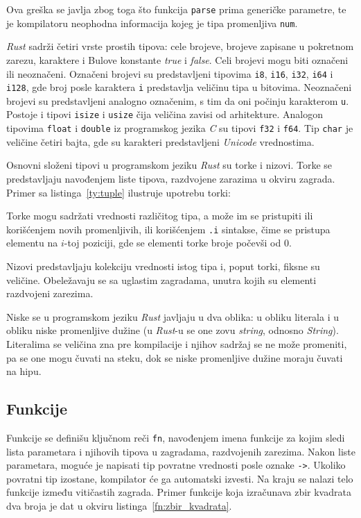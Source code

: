 \documentclass[12pt,oneside]{memoir}
\begin{document}
\noindent
Ova greška se javlja zbog toga što funkcija \texttt{parse}
prima generičke parametre, te je kompilatoru neophodna informacija
kojeg je tipa promenljiva \texttt{num}.

\emph{Rust} sadrži četiri vrste prostih tipova: cele brojeve,
brojeve zapisane u pokretnom zarezu, karaktere i Bulove
konstante \emph{true} i \emph{false}. Celi brojevi mogu biti
označeni ili neoznačeni. Označeni brojevi su predstavljeni
tipovima \texttt{i8}, \texttt{i16}, \texttt{i32}, \texttt{i64} i
\texttt{i128}, gde broj posle karaktera \texttt{i} predstavlja
veličinu tipa u bitovima. Neoznačeni brojevi su predstavljeni
analogno označenim, s tim da oni počinju karakterom \texttt{u}.
Postoje i tipovi \texttt{isize} i \texttt{usize} čija veličina
zavisi od arhitekture.
Analogon tipovima \texttt{float} i \texttt{double} iz programskog
jezika \emph{C} su tipovi \texttt{f32} i \texttt{f64}. Tip
\texttt{char} je veličine četiri bajta, gde su karakteri predstavljeni
\emph{Unicode} vrednostima.

Osnovni složeni tipovi u programskom jeziku \emph{Rust} su torke
i nizovi. Torke se predstavljaju navođenjem liste tipova, razdvojene zarazima u okviru
zagrada. Primer sa listinga~\ref{ty:tuple} ilustruje upotrebu torki:



Torke mogu sadržati vrednosti različitog tipa, a može im se pristupiti
ili korišćenjem novih promenljivih, ili korišćenjem \texttt{.i} sintakse,
čime se pristupa elementu na $i$-toj poziciji, gde se elementi torke broje
počevši od $0$.

Nizovi predstavljaju kolekciju vrednosti istog tipa i, poput torki,
fiksne su veličine. Obeležavaju se sa uglastim zagradama, unutra kojih su elementi
razdvojeni zarezima.

Niske se u programskom jeziku \emph{Rust} javljaju u dva oblika:
u obliku literala i u obliku niske promenljive dužine
(u \emph{Rust}-u se one zovu \emph{string}, odnosno \emph{String}).
Literalima se veličina zna pre kompilacije i njihov sadržaj se ne može promeniti,
pa se one mogu čuvati na steku, dok se niske promenljive dužine moraju čuvati na hipu.

\subsection{Funkcije}
Funkcije se definišu ključnom reči \texttt{fn}, navođenjem imena funkcije za kojim sledi
lista parametara i njihovih tipova u zagradama, razdvojenih zarezima. Nakon liste parametara,
moguće je napisati tip povratne vrednosti posle oznake \texttt{->}. Ukoliko povratni tip izostane,
kompilator će ga automatski izvesti. Na kraju se nalazi telo funkcije između vitičastih zagrada.
Primer funkcije koja izračunava zbir kvadrata dva broja je dat u okviru listinga~\ref{fn:zbir_kvadrata}.
\end{document}
